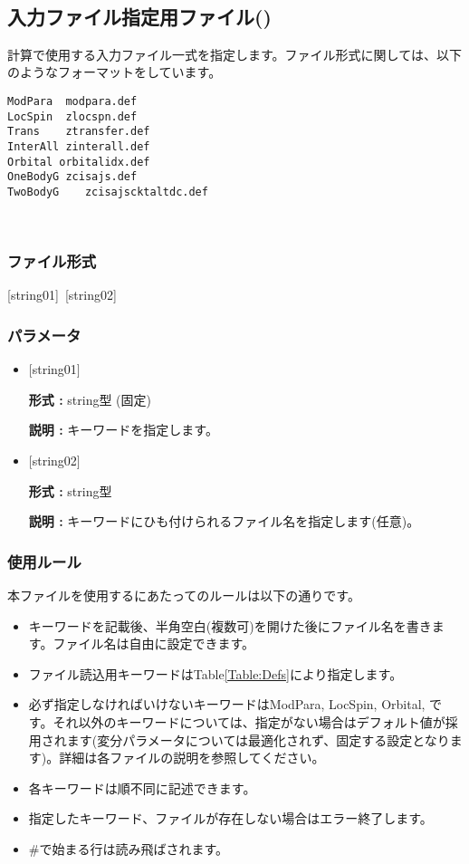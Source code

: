 \newpage
~\subsection{入力ファイル指定用ファイル()}
\label{Subsec:InputFileList}
計算で使用する入力ファイル一式を指定します。ファイル形式に関しては、以下のようなフォーマットをしています。\\
\begin{minipage}{10cm}
\begin{screen}
\begin{verbatim}
ModPara  modpara.def
LocSpin  zlocspn.def
Trans    ztransfer.def
InterAll zinterall.def
Orbital orbitalidx.def
OneBodyG zcisajs.def
TwoBodyG	zcisajscktaltdc.def
\end{verbatim}
\end{screen}
\end{minipage}
\\
\subsubsection{ファイル形式}
[string01]~[string02]
\subsubsection{パラメータ}
 \begin{itemize}
   \item  $[$string01$]$
   
   {\bf 形式 :} string型 (固定)
   
   {\bf 説明 :} キーワードを指定します。
   
   \item  $[$string02$]$
   
    {\bf 形式 :} string型 

   {\bf 説明 :} キーワードにひも付けられるファイル名を指定します(任意)。
 \end{itemize}
\subsubsection{使用ルール}
本ファイルを使用するにあたってのルールは以下の通りです。
\begin{itemize}
\item キーワードを記載後、半角空白(複数可)を開けた後にファイル名を書きます。ファイル名は自由に設定できます。
\item ファイル読込用キーワードはTable\ref{Table:Defs}により指定します。
\item 必ず指定しなければいけないキーワードはModPara, LocSpin, Orbital, です。それ以外のキーワードについては、指定がない場合はデフォルト値が採用されます(変分パラメータについては最適化されず、固定する設定となります)。詳細は各ファイルの説明を参照してください。
\item 各キーワードは順不同に記述できます。
\item 指定したキーワード、ファイルが存在しない場合はエラー終了します。
\item $\#$で始まる行は読み飛ばされます。
\end{itemize}

